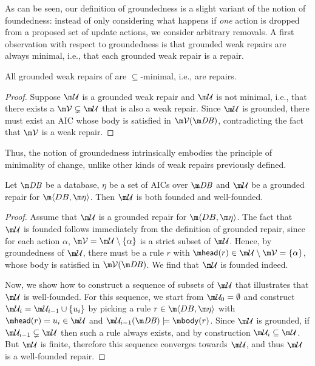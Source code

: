 As can be seen, our definition of groundedness is a slight variant of the notion of foundedness: instead of only considering what happens if \emph{one} action is dropped from a proposed set of update actions, we consider arbitrary removals. 
A first observation with respect to groundedness is that grounded weak repairs are always minimal, i.e., that each grounded weak repair is a repair. 
\begin{proposition}
 All grounded weak repairs of \fulldb are $\subseteq$-minimal, i.e., are repairs. 
\end{proposition}
\begin{proof}
 Suppose $\UU$ is a grounded weak repair and $\UU$ is not minimal, i.e., that there exists a $\VV\subsetneq \UU$ that is also a weak repair. 
 Since $\UU$ is grounded, there must exist an AIC whose body is satisfied in $\VV(\db)$, contradicting the fact  that $\VV$ is a weak repair. 
\end{proof}
Thus, the notion of groundedness intrinsically embodies the principle of minimality of change, unlike other kinds of weak repairs previously defined.


\begin{proposition}
  \label{prop:founded}
  Let $\db$ be a database, $\eta$ be a set of AICs over $\db$ and $\UU$ be a grounded repair for $\fulldb$.
  Then $\UU$ is both founded and well-founded.
\end{proposition}
\begin{proof}
  Assume that $\UU$ is a grounded repair for $\fulldb$.
  The fact that $\UU$ is founded follows immediately from the definition of grounded repair, since for each action $\alpha$, $\VV=\UU\setminus\{\alpha\}$ is a strict subset of $\UU$. Hence, by groundedness of $\UU$, there must be a rule $r$ with $\head(r)\in \UU\setminus \VV=\{\alpha\}$, whose body is satisfied in $\VV(\db)$. We find that $\UU$ is founded indeed. %
  
  Now, we show how to construct a sequence of subsets of $\UU$ that illustrates that $\UU$ is well-founded. 
  For this sequence, we start from $\UU_0=\emptyset$ and construct $\UU_i=\UU_{i-1}\cup\{u_i\}$ by picking a rule $r\in \fulldb$ with $\head(r)=u_i\in\UU$ and $\UU_{i-1}(\db)\models \body(r)$.
  Since $\UU$ is grounded, if $\UU_{i-1}\subsetneq\UU$ then such a rule always exists,
  and by construction $\UU_i\subseteq\UU$.
  But $\UU$ is finite, therefore this sequence converges towards $\UU$, and thus $\UU$ is a well-founded repair.
\end{proof}

